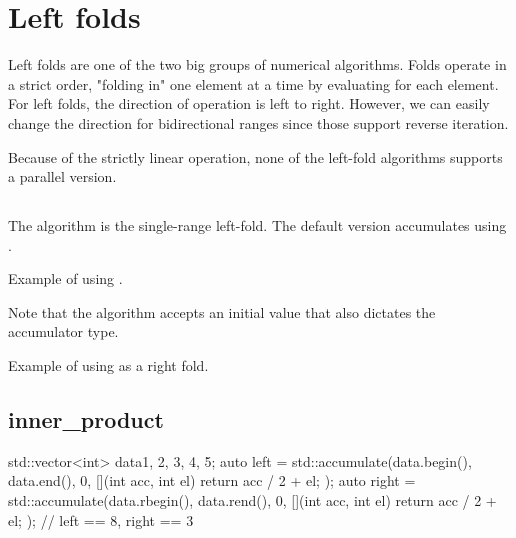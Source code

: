 \section{Left folds}

Left folds are one of the two big groups of numerical algorithms. Folds operate in a strict order, "folding in" one element at a time by evaluating  for each element. For left folds, the direction of operation is left to right. However, we can easily change the direction for bidirectional ranges since those support reverse iteration.

Because of the strictly linear operation, none of the left-fold algorithms supports a parallel version.

\subsection{\texorpdfstring{}{\texttt{std::accumulate}}}

The  algorithm is the single-range left-fold. The default version accumulates using .


\begin{box-note}
\footnotesize Example of using .
\tcblower
{}
\end{box-note}

Note that the algorithm accepts an initial value that also dictates the accumulator type.

\begin{box-note}
\footnotesize Example of using  as a right fold.
\tcblower
{}
\end{box-note}


\subsection{inner\_product}


\begin{box-note}
\begin{cppcode}
std::vector<int> data{1, 2, 3, 4, 5};
auto left = std::accumulate(data.begin(), data.end(), 0, [](int acc, int el) {
    return acc / 2 + el;
});
auto right = std::accumulate(data.rbegin(), data.rend(), 0, [](int acc, int el) {
    return acc / 2 + el;
});
// left == 8, right == 3
\end{cppcode}
\end{box-note}

